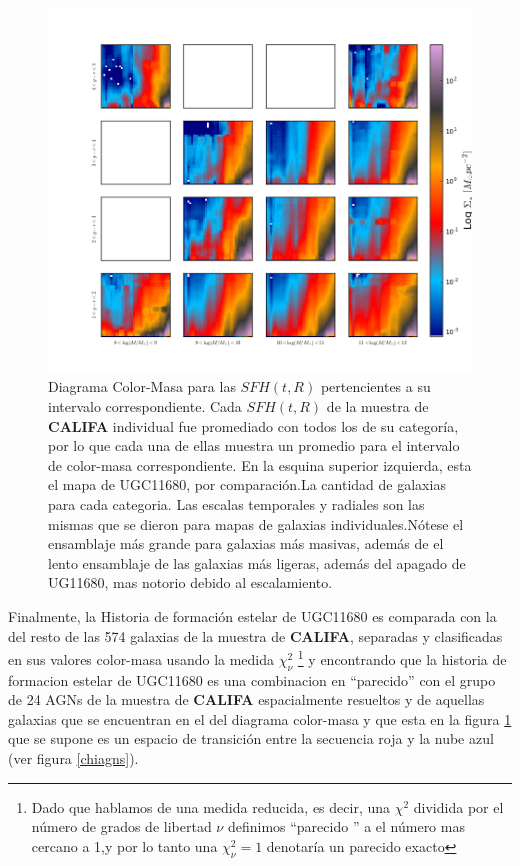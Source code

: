 \documentclass[12pt]{article}
\begin{document}
\begin{figure}
  \centering
    \includegraphics[scale=0.6]{cmd_sfh.png}
  \caption{Diagrama Color-Masa  para las $SFH(t,R)$ pertencientes a su intervalo correspondiente.
           Cada $SFH(t,R)$ de la muestra de  \textbf{CALIFA} individual fue promediado con todos los de su categoría,
           por lo que cada una de ellas muestra un promedio para el intervalo de color-masa correspondiente. En la esquina superior izquierda, esta el mapa de UGC11680, por comparación.La cantidad de galaxias para cada categoria. Las escalas temporales y radiales son las mismas que se dieron para mapas de galaxias individuales.Nótese el ensamblaje más grande para galaxias más masivas, además de el lento ensamblaje de las galaxias más ligeras, además del apagado de UG11680, mas notorio debido al escalamiento.}
  \label{CMD}
\end{figure}

Finalmente, la Historia de formación estelar de UGC11680  es comparada con la del resto de las 574 galaxias  de la muestra de \textbf{CALIFA}, separadas y clasificadas en sus valores color-masa usando la medida $\chi^2_{\nu}$ \footnote{Dado que hablamos de una medida reducida, es decir, una $\chi^2$ dividida por el número de grados de libertad $\nu$ definimos ``parecido '' a el número mas cercano a 1,y por lo tanto una $\chi^2_{\nu} =1 $ denotaría un parecido exacto} y encontrando que la historia de formacion estelar de UGC11680 es una combinacion en ``parecido''  con el grupo de 24 AGNs de la muestra de \textbf{CALIFA} espacialmente resueltos y de aquellas galaxias que se encuentran en el  del diagrama color-masa y que esta en la figura \ref{CMD} que se supone es un espacio de transición entre la secuencia roja y la nube azul (ver figura \ref{chiagns}).
\end{document}
